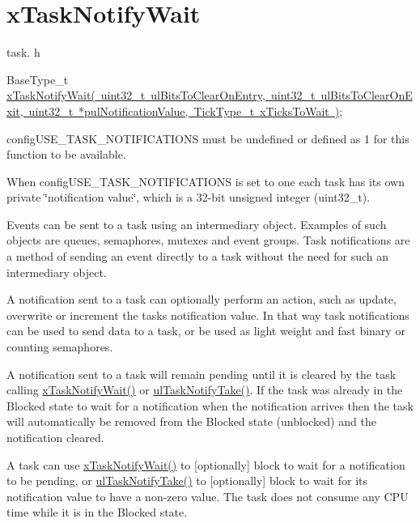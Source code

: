 \hypertarget{group__x_task_notify_wait}{}\section{x\+Task\+Notify\+Wait}
\label{group__x_task_notify_wait}
task. h 
\begin{DoxyPre}BaseType\_t \mbox{\hyperlink{task_8h_a0475fcda9718f403521c270a7270ff93}{xTaskNotifyWait( uint32\_t ulBitsToClearOnEntry, uint32\_t ulBitsToClearOnExit, uint32\_t *pulNotificationValue, TickType\_t xTicksToWait )}};\end{DoxyPre}


config\+U\+S\+E\+\_\+\+T\+A\+S\+K\+\_\+\+N\+O\+T\+I\+F\+I\+C\+A\+T\+I\+O\+NS must be undefined or defined as 1 for this function to be available.

When config\+U\+S\+E\+\_\+\+T\+A\+S\+K\+\_\+\+N\+O\+T\+I\+F\+I\+C\+A\+T\+I\+O\+NS is set to one each task has its own private \char`\"{}notification value\char`\"{}, which is a 32-\/bit unsigned integer (uint32\+\_\+t).

Events can be sent to a task using an intermediary object. Examples of such objects are queues, semaphores, mutexes and event groups. Task notifications are a method of sending an event directly to a task without the need for such an intermediary object.

A notification sent to a task can optionally perform an action, such as update, overwrite or increment the task\textquotesingle{}s notification value. In that way task notifications can be used to send data to a task, or be used as light weight and fast binary or counting semaphores.

A notification sent to a task will remain pending until it is cleared by the task calling \mbox{\hyperlink{task_8h_a0475fcda9718f403521c270a7270ff93}{x\+Task\+Notify\+Wait()}} or \mbox{\hyperlink{task_8h_a66540bef602522a01a519f776e4c07d8}{ul\+Task\+Notify\+Take()}}. If the task was already in the Blocked state to wait for a notification when the notification arrives then the task will automatically be removed from the Blocked state (unblocked) and the notification cleared.

A task can use \mbox{\hyperlink{task_8h_a0475fcda9718f403521c270a7270ff93}{x\+Task\+Notify\+Wait()}} to \mbox{[}optionally\mbox{]} block to wait for a notification to be pending, or \mbox{\hyperlink{task_8h_a66540bef602522a01a519f776e4c07d8}{ul\+Task\+Notify\+Take()}} to \mbox{[}optionally\mbox{]} block to wait for its notification value to have a non-\/zero value. The task does not consume any C\+PU time while it is in the Blocked state.

